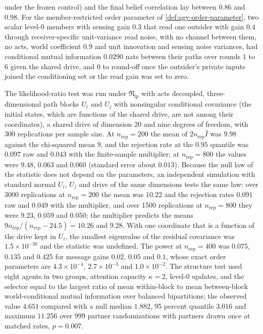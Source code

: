 \begin{numcheck}
under the frozen control) and the final belief correlation lay between $0.86$ and $0.98$. For the member-restricted order parameter of \cref{def:agy-order-parameter}, two scalar level-0 members with sensing gain $0.3$ that read one outsider with gain $0.4$ through receiver-specific unit-variance read noise, with no channel between them, no acts, world coefficient $0.9$ and unit innovation and sensing noise variances, had conditional mutual information $0.0290$ nats between their paths over rounds $1$ to $6$ given the shared drive, and $0$ to round-off once the outsider's private inputs joined the conditioning set or the read gain was set to zero.
\end{numcheck}

\begin{numcheck}\label{chk:agy-tests}
The likelihood-ratio test was run under $\mathfrak N_{\mathrm{lp}}$ with acts decoupled, three-dimensional path blocks $U_i$ and $U_j$ with nonsingular conditional covariance (the initial states, which are functions of the shared drive, are not among their coordinates), a shared drive of dimension 20 and nine degrees of freedom, with 300 replications per sample size. At $n_{\mathrm{rep}}=200$ the mean of $2n_{\mathrm{rep}}\hat I$ was $9.98$ against the chi-squared mean $9$, and the rejection rate at the $0.95$ quantile was $0.097$ raw and $0.043$ with the finite-sample multiplier; at $n_{\mathrm{rep}}=800$ the values were $9.48$, $0.063$ and $0.060$ (standard error about $0.013$). Because the null law of the statistic does not depend on the parameters, an independent simulation with standard normal $U_i$, $U_j$ and drive of the same dimensions tests the same law: over 3000 replications at $n_{\mathrm{rep}}=200$ the mean was $10.22$ and the rejection rates $0.091$ raw and $0.049$ with the multiplier, and over 1500 replications at $n_{\mathrm{rep}}=800$ they were $9.23$, $0.059$ and $0.050$; the multiplier predicts the means $9n_{\mathrm{rep}}/(n_{\mathrm{rep}}-24.5)=10.26$ and $9.28$. With one coordinate that is a function of the drive kept in $U_i$, the smallest eigenvalue of the residual covariance was $1.5\times10^{-30}$ and the statistic was undefined. The power at $n_{\mathrm{rep}}=400$ was $0.075$, $0.135$ and $0.425$ for message gains $0.02$, $0.05$ and $0.1$, whose exact order parameters are $4.3\times10^{-4}$, $2.7\times10^{-3}$ and $1.0\times10^{-2}$. The structure test used eight agents in two groups, attention capacity $\kappa=2$, level-0 updates, and the selector equal to the largest ratio of mean within-block to mean between-block world-conditional mutual information over balanced bipartitions; the observed value $4.651$ compared with a null median $1.882$, 95 percent quantile $3.016$ and maximum $11.256$ over 999 partner randomizations with partners drawn once at matched rates, $p=0.007$.
\end{numcheck}

